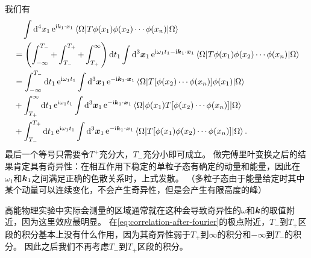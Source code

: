 \documentclass[hyperref, UTF8, a4paper]{ctexart}
\newcommand*{\ii}{\mathrm{i}}
\newcommand*{\ee}{\mathrm{e}}
\begin{document}
我们有
\begin{equation}
    \begin{aligned}
        &\quad \int \dd[4]{x_1} \ee^{\ii k_1 \cdot x_1} \mel{\Omega}{T \phi(x_1) \phi(x_2) \cdots \phi(x_n)}{\Omega} \\
        &= \left( \int_{-\infty}^{T_-} + \int_{T_-}^{T_+} + \int_{T_+}^\infty \right) \dd{t_1} \int \dd[3]{\vb*{x}_1} \ee^{\ii \omega_1 t_1 - \ii \vb*{k}_1 \cdot \vb*{x}_1} \mel{\Omega}{T \phi(x_1) \phi(x_2) \cdots \phi(x_n)}{\Omega} \\
        &= \int_{-\infty}^{T_-} \dd{t_1} \ee^{\ii \omega_1 t_1} \int \dd[3]{\vb*{x}_1} \ee^{- \ii \vb*{k}_1 \cdot \vb*{x}_1} \mel{\Omega}{T [\phi(x_2) \cdots \phi(x_n)] \phi(x_1)}{\Omega} \\
        &+ \int_{T_+}^{\infty} \dd{t_1} \ee^{\ii \omega_1 t_1} \int \dd[3]{\vb*{x}_1} \ee^{- \ii \vb*{k}_1 \cdot \vb*{x}_1} \mel{\Omega}{\phi(x_1) T [\phi(x_2) \cdots \phi(x_n)]}{\Omega} \\
        &+ \int_{T_-}^{T_+} \dd{t_1} \ee^{\ii \omega_1 t_1} \int \dd[3]{\vb*{x}_1} \ee^{- \ii \vb*{k}_1 \cdot \vb*{x}_1} \mel{\Omega}{T [\phi(x_1) \phi(x_2) \cdots \phi(x_n)]}{\Omega}.
    \end{aligned}
    \label{eq:correlation-after-fourier}
\end{equation}
最后一个等号只需要令$T^+$充分大，$T_-$充分小即可成立。
做完傅里叶变换之后的结果肯定具有奇异性：在相互作用下稳定的单粒子态有确定的动量和能量，因此在$\omega_1$和$\vb*{k}_1$之间满足正确的色散关系时，上式发散。
（多粒子态由于能量给定时其中某个动量可以连续变化，不会产生奇异性，但是会产生有限高度的峰）

高能物理实验中实际会测量的区域通常就在这种会导致奇异性的$\omega$和$\vb*{k}$的取值附近，因为这里效应最明显。
在\eqref{eq:correlation-after-fourier}的极点附近，$T_-$到$T_+$区段的积分基本上没有什么作用，因为其奇异性弱于$T_+$到$\infty$的积分和$-\infty$到$T_-$的积分。
因此之后我们不再考虑$T_-$到$T_+$区段的积分。
\end{document}
